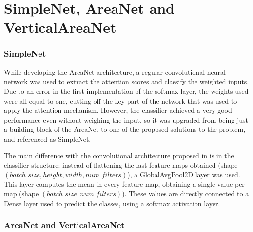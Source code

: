 
\section{SimpleNet, AreaNet and VerticalAreaNet}
\label{sec:area_net}

\subsubsection{SimpleNet}

While developing the AreaNet architecture, a regular convolutional neural
network was used to extract the attention scores and classify the weighted
inputs.
Due to an error in the first implementation of the softmax layer, the weights
used were all equal to one, cutting off the key part of the network that was
used to apply the attention mechanism.
However, the classifier achieved a very good performance even without weighing
the input, so it was upgraded from being just a building block of the AreaNet
to one of the proposed solutions to the problem, and referenced as SimpleNet.

The main difference with the convolutional architecture proposed in
 is in the classifier structure:
instead of flattening the last feature maps obtained
(shape $(batch\_size, height, width, num\_filters)$),
a GlobalAvgPool2D layer was used.
This layer computes the mean in every feature map, obtaining a single value per
map (shape $(batch\_size, num\_filters)$).
These values are directly connected to a Dense layer used to predict the classes,
using a softmax activation layer.

\subsubsection{AreaNet and VerticalAreaNet}

